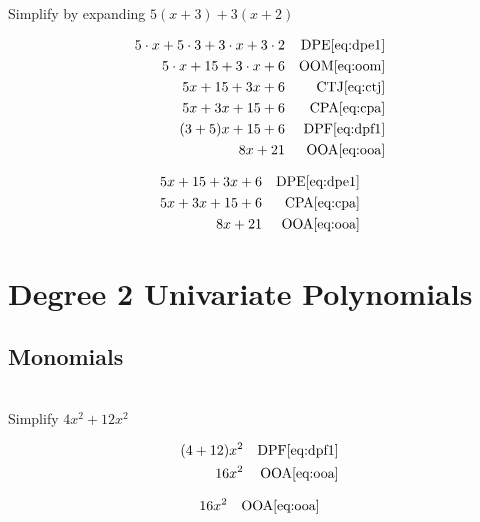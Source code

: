 \begin{example}[id:20141109-095842] \label{20141109-095842}  \hfill \\

Simplify by expanding $5(x+3)+3(x+2)$

\soln

\solnsteps
\begin{align*}
5 \cdot x + 5 \cdot 3 + 3 \cdot x + 3 \cdot 2 && \text{DPE} \eqref{eq:dpe1} \\ 
5 \cdot x + 15 + 3 \cdot x + 6 && \text{OOM} \eqref{eq:oom} \\
5x + 15 + 3x+6 && \text{CTJ} \eqref{eq:ctj} \\
5x +3x+ 15 + 6 && \text{CPA} \eqref{eq:cpa} \\
(3+5)x+15+6 && \text{DPF} \eqref{eq:dpf1} \\
8x+21 && \text{OOA} \eqref{eq:ooa} 
\end{align*}

\soln

\lesssteps
\begin{align*}
5x + 15 +3x+6 && \text{DPE} \eqref{eq:dpe1} \\
5x+3x+15+6 && \text{CPA} \eqref{eq:cpa} \\
8x+21 && \text{OOA} \eqref{eq:ooa} 
\end{align*}

\end{example}

\section{Degree 2 Univariate Polynomials}

\subsection*{Monomials}

\begin{example}[id:20141106-151138] \label{20141106-151138}  \hfill \\

Simplify $4x^2+12x^2$

\soln

\solnsteps
\begin{align*}
(4+12)x^2 && \text{DPF} \eqref{eq:dpf1} \\
16x^2 && \text{OOA} \eqref{eq:ooa} 
\end{align*}

\soln

\lesssteps
\begin{align*}
16x^2 && \text{OOA} \eqref{eq:ooa} 
\end{align*}

\end{example}

